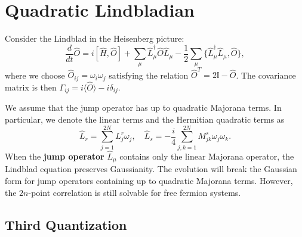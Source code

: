 \documentclass{SciPost}
\begin{document}
\section{Quadratic Lindbladian}

Consider the Lindblad in the Heisenberg picture:
\begin{equation}
	\frac{d}{dt} \hat O
	= i[\hat H, \hat O] + \sum_\mu \hat L_\mu^\dagger \hat O\hat L_\mu - \frac{1}{2} \sum_\mu\{\hat L_\mu^\dagger \hat L_\mu, \hat O \},
\end{equation}
where we choose $\hat O_{ij} = \omega_i\omega_j$ satisfying the relation $\hat O^T = 2\mathbb I - \hat O$. The covariance matrix is then $\Gamma_{ij} = i\langle \hat O\rangle - i\delta_{ij}$.

We assume that the jump operator has up to quadratic Majorana terms. In particular, we denote the linear terms and the Hermitian quadratic terms as
\begin{equation}
	\hat L_r = \sum_{j=1}^{2N} L^r_{j} \omega_j, \quad
	\hat L_s = -\frac{i}{4} \sum_{j,k=1}^{2N} M^s_{jk} \omega_j \omega_k.
\end{equation}
When the \textbf{jump operator} $\hat L_\mu$ contains only the linear Majorana operator, the Lindblad equation preserves Gaussianity. The evolution will break the Gaussian form for jump operators containing up to quadratic Majorana terms. 
However, the $2n$-point correlation is still solvable for free fermion systems.



\subsection{Third Quantization}
\end{document}
